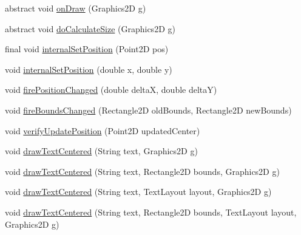 \begin{DoxyCompactItemize}
\item 
abstract void \hyperlink{classorg_1_1tzi_1_1use_1_1gui_1_1views_1_1diagrams_1_1elements_1_1_placeable_node_a88954e6fc5c6d4ca3b1cfbf1054bec76}{on\-Draw} (Graphics2\-D g)
\item 
abstract void \hyperlink{classorg_1_1tzi_1_1use_1_1gui_1_1views_1_1diagrams_1_1elements_1_1_placeable_node_ae5e61241c826ce7adb12395488fd0ecc}{do\-Calculate\-Size} (Graphics2\-D g)
\item 
final void \hyperlink{classorg_1_1tzi_1_1use_1_1gui_1_1views_1_1diagrams_1_1elements_1_1_placeable_node_a02b14428ffd21f415a13b77bf5cbf65b}{internal\-Set\-Position} (Point2\-D pos)
\item 
void \hyperlink{classorg_1_1tzi_1_1use_1_1gui_1_1views_1_1diagrams_1_1elements_1_1_placeable_node_a27a60e5fb35d55b4b5f8da5bdc42043a}{internal\-Set\-Position} (double x, double y)
\item 
void \hyperlink{classorg_1_1tzi_1_1use_1_1gui_1_1views_1_1diagrams_1_1elements_1_1_placeable_node_afd445bf78cfb3a1c05b9e7f95fd73da9}{fire\-Position\-Changed} (double delta\-X, double delta\-Y)
\item 
void \hyperlink{classorg_1_1tzi_1_1use_1_1gui_1_1views_1_1diagrams_1_1elements_1_1_placeable_node_a0ee6c31557176a5c6e5e82121c4f6a7d}{fire\-Bounds\-Changed} (Rectangle2\-D old\-Bounds, Rectangle2\-D new\-Bounds)
\item 
void \hyperlink{classorg_1_1tzi_1_1use_1_1gui_1_1views_1_1diagrams_1_1elements_1_1_placeable_node_a158c68c15486a671d6a5ebd0e84cbfcf}{verify\-Update\-Position} (Point2\-D updated\-Center)
\item 
void \hyperlink{classorg_1_1tzi_1_1use_1_1gui_1_1views_1_1diagrams_1_1elements_1_1_placeable_node_a47a31a41f14de8cc370cb7d6d14d7479}{draw\-Text\-Centered} (String text, Graphics2\-D g)
\item 
void \hyperlink{classorg_1_1tzi_1_1use_1_1gui_1_1views_1_1diagrams_1_1elements_1_1_placeable_node_a733ffb1bff219412f02205f2bed9abc3}{draw\-Text\-Centered} (String text, Rectangle2\-D bounds, Graphics2\-D g)
\item 
void \hyperlink{classorg_1_1tzi_1_1use_1_1gui_1_1views_1_1diagrams_1_1elements_1_1_placeable_node_ae900ff917cd3719a850ea9df6dbe4dc8}{draw\-Text\-Centered} (String text, Text\-Layout layout, Graphics2\-D g)
\item 
void \hyperlink{classorg_1_1tzi_1_1use_1_1gui_1_1views_1_1diagrams_1_1elements_1_1_placeable_node_adf98ca8e9432d0a281ab1c89240c97c9}{draw\-Text\-Centered} (String text, Rectangle2\-D bounds, Text\-Layout layout, Graphics2\-D g)

\end{DoxyCompactItemize}
